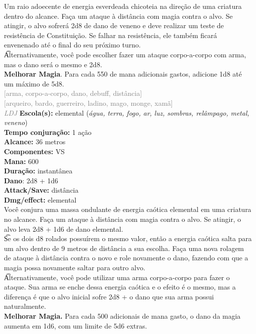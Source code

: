 \documentclass{RPG_Adventure}[2021/10/20]
\begin{document}
{\normalsize Um raio adoecente de energia esverdeada chicoteia na direção de uma criatura dentro do alcance. Faça um ataque à distância com magia contra o alvo. Se atingir, o alvo sofrerá 2d8 de dano de veneno e deve realizar um teste de resistência de Constituição. Se falhar na resistência, ele também ficará envenenado até o final do seu próximo turno.\\\t Alternativamente, você pode escolher fazer um ataque corpo-a-corpo com arma, mas o dano será o mesmo e 2d8.\\\t \textbf{Melhorar Magia}. Para cada 550 de mana adicionais gastos, adicione 1d8 até um máximo de 5d8.\\}
{\scriptsize \textcolor{gray}{[arma, corpo-a-corpo, dano, debuff, distância]\\}}
{\scriptsize \textcolor{gray}{[arqueiro, bardo, guerreiro, ladino, mago, monge, xamã]\\}}
{\tiny \textcolor{gray}{\textit{LDJ}}}\jump{}
{\small \t \textbf{Escola(s):} elemental (\textit{água, terra, fogo, ar, luz, sombras, relâmpago, metal, veneno})\\\t \textbf{Tempo conjuração:} 1 ação\\\t \textbf{Alcance:} 36 metros\\\t \textbf{Componentes:} VS\\\t \textbf{Mana:} 600\\\t \textbf{Duração:} instantânea\\\t \textbf{Dano}: 2d8 + 1d6\\\t \textbf{Attack/Save:} distância\\\t \textbf{Dmg/effect:} elemental\\}
{\normalsize Você conjura uma massa ondulante de energia caótica elemental em uma criatura no alcance. Faça um ataque à distância com magia contra o alvo. Se atingir, o alvo leva 2d8 + 1d6 de dano elemental.\\\t Se os dois d8 rolados possuírem o mesmo valor, então a energia caótica salta para um alvo dentro de 9 metros de distância a sua escolha. Faça uma nova rolagem de ataque à distância contra o novo e role novamente o dano, fazendo com que a magia possa novamente saltar para outro alvo.\\\t Alternativamente, você pode utilizar uma arma corpo-a-corpo para fazer o ataque. Sua arma se enche dessa energia caótica e o efeito é o mesmo, mas a diferença é que o alvo inicial sofre 2d8 + o dano que sua arma possui naturalmente.\\\t \textbf{Melhorar Magia.} Para cada 500 adicionais de mana gasto, o dano da magia aumenta em 1d6, com um limite de 5d6 extras.\\}
\end{document}
